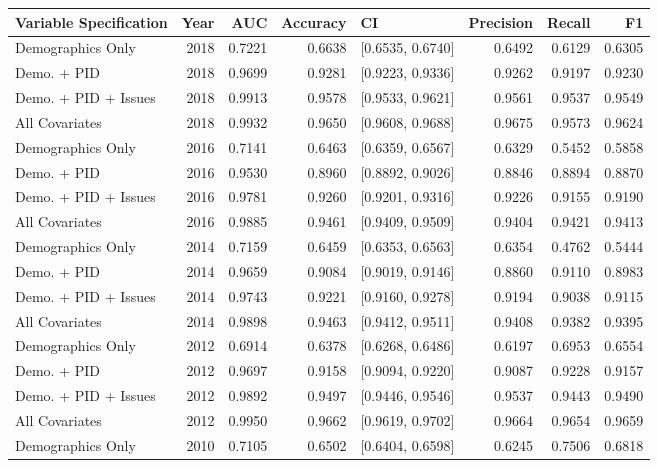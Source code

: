 \begin{table}[H]
\centering
\begin{tabular}{lrrrlrrr}
  \toprule
Variable Specification & Year & AUC & Accuracy & CI & Precision & Recall & F1 \\ 
  \midrule
Demographics Only & 2018 & 0.7221 & 0.6638 & [0.6535, 0.6740] & 0.6492 & 0.6129 & 0.6305 \\ 
  Demo. + PID & 2018 & 0.9699 & 0.9281 & [0.9223, 0.9336] & 0.9262 & 0.9197 & 0.9230 \\ 
  Demo. + PID + Issues & 2018 & 0.9913 & 0.9578 & [0.9533, 0.9621] & 0.9561 & 0.9537 & 0.9549 \\ 
  All Covariates & 2018 & 0.9932 & 0.9650 & [0.9608, 0.9688] & 0.9675 & 0.9573 & 0.9624 \\ 
  Demographics Only & 2016 & 0.7141 & 0.6463 & [0.6359, 0.6567] & 0.6329 & 0.5452 & 0.5858 \\ 
  Demo. + PID & 2016 & 0.9530 & 0.8960 & [0.8892, 0.9026] & 0.8846 & 0.8894 & 0.8870 \\ 
  Demo. + PID + Issues & 2016 & 0.9781 & 0.9260 & [0.9201, 0.9316] & 0.9226 & 0.9155 & 0.9190 \\ 
  All Covariates & 2016 & 0.9885 & 0.9461 & [0.9409, 0.9509] & 0.9404 & 0.9421 & 0.9413 \\ 
  Demographics Only & 2014 & 0.7159 & 0.6459 & [0.6353, 0.6563] & 0.6354 & 0.4762 & 0.5444 \\ 
  Demo. + PID & 2014 & 0.9659 & 0.9084 & [0.9019, 0.9146] & 0.8860 & 0.9110 & 0.8983 \\ 
  Demo. + PID + Issues & 2014 & 0.9743 & 0.9221 & [0.9160, 0.9278] & 0.9194 & 0.9038 & 0.9115 \\ 
  All Covariates & 2014 & 0.9898 & 0.9463 & [0.9412, 0.9511] & 0.9408 & 0.9382 & 0.9395 \\ 
  Demographics Only & 2012 & 0.6914 & 0.6378 & [0.6268, 0.6486] & 0.6197 & 0.6953 & 0.6554 \\ 
  Demo. + PID & 2012 & 0.9697 & 0.9158 & [0.9094, 0.9220] & 0.9087 & 0.9228 & 0.9157 \\ 
  Demo. + PID + Issues & 2012 & 0.9892 & 0.9497 & [0.9446, 0.9546] & 0.9537 & 0.9443 & 0.9490 \\ 
  All Covariates & 2012 & 0.9950 & 0.9662 & [0.9619, 0.9702] & 0.9664 & 0.9654 & 0.9659 \\ 
  Demographics Only & 2010 & 0.7105 & 0.6502 & [0.6404, 0.6598] & 0.6245 & 0.7506 & 0.6818 \\ 

\end{tabular}
\end{table}
